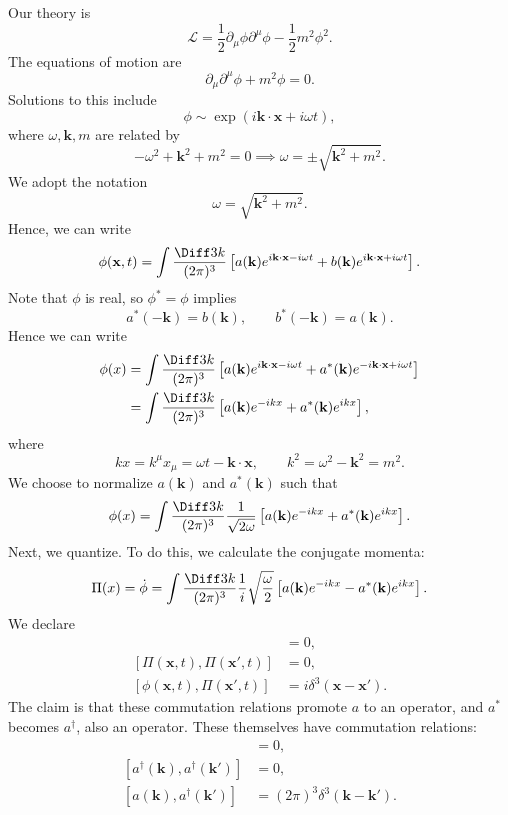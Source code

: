 \documentclass[12pt]{article}
\begin{document}
Our theory is
\[
\mathcal{L} = \frac{1}{2} \partial_\mu \phi \partial^\mu \phi - \frac{1}{2} m^2 \phi^2.
\]
The equations of motion are
\[
\partial_\mu \partial^\mu \phi + m^2 \phi = 0.
\]
Solutions to this include
\[
\phi \sim \exp\left( i \mathbf{k} \cdot \mathbf{x} + i \omega t\right),
\]
where $\omega, \mathbf{k}, m$ are related by
\[
	-\omega^2 + \mathbf{k}^2 + m^2 = 0 \implies \omega = \pm \sqrt{\mathbf{k}^2 + m^2}.
\]
We adopt the notation
\[
	\omega = \sqrt{\mathbf{k}^2 + m^2}.
\]
Hence, we can write
\[
	\phi(\mathbf{x}, t) = \int \frac{\Diff3 k}{(2 \pi)^3} \left[ a(\mathbf{k}) e^{i \mathbf{k} \cdot \mathbf{x} - i \omega t} + b(\mathbf{k}) e^{i \mathbf{k} \cdot \mathbf{x} + i \omega t} \right].
\]
Note that $\phi$ is real, so $\phi^\ast = \phi$ implies
\[
a^\ast(- \mathbf{k}) = b(\mathbf{k}), \qquad b^\ast(-\mathbf{k}) = a(\mathbf{k}).
\]
Hence we can write
\begin{align*}
	\phi(x) &= \int \frac{\Diff3 k}{(2 \pi)^3} \left[ a(\mathbf{k}) e^{i \mathbf{k} \cdot \mathbf{x} - i \omega t} + a^\ast(\mathbf{k}) e^{-i \mathbf{k} \cdot \mathbf{x} + i \omega t} \right] \\
		&= \int \frac{\Diff3 k}{( 2\pi)^3} \left[ a(\mathbf{k}) e^{-ikx} + a^\ast(\mathbf{k}) e^{ik x} \right],
\end{align*}
where
\[
kx = k^\mu x_\mu = \omega t - \mathbf{k} \cdot \mathbf{x}, \qquad k^2 = \omega^2 - \mathbf{k}^2 = m^2.
\]
We choose to normalize $a(\mathbf{k})$ and $a^\ast(\mathbf{k})$ such that
\[
	\phi(x) = \int \frac{\Diff 3k}{(2\pi)^3} \frac{1}{\sqrt{2 \omega}} \left[ a(\mathbf{k}) e^{-ikx} + a^\ast(\mathbf{k}) e^{ikx}\right].
\]
Next, we quantize. To do this, we calculate the conjugate momenta:
\[
	\Pi(x) = \dot \phi = \int \frac{\Diff3k}{(2\pi)^3} \frac{1}{i}\sqrt{\frac \omega2} \left[ a(\mathbf{k}) e^{-ikx} - a^\ast(\mathbf{k})e^{ikx}\right].
\]
We declare
\begin{align*}
	[\phi(\mathbf{x}, t), \phi(\mathbf{x}', t)] &= 0,\\
	[\Pi(\mathbf{x},t), \Pi(\mathbf{x}',t)] &= 0,\\
	[\phi(\mathbf{x}, t), \Pi(\mathbf{x}', t)] &= i \delta^3(\mathbf{x} - \mathbf{x}').
\end{align*}
The claim is that these commutation relations promote $a$ to an operator, and $a^\ast$ becomes $a^\dagger$, also an operator. These themselves have commutation relations:
\begin{align*}
	[a(\mathbf{k}), a(\mathbf{k}')] &= 0,\\
	[a^\dagger(\mathbf{k}), a^\dagger(\mathbf{k}')] &= 0,\\
	[a(\mathbf{k}), a^\dagger(\mathbf{k}')] &= (2 \pi)^3 \delta^3(\mathbf{k} - \mathbf{k}').
\end{align*}
\end{document}
